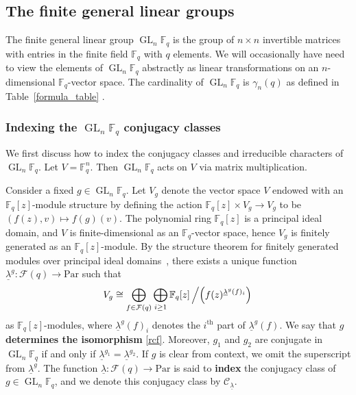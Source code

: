 \documentclass[10pt]{article}
\theoremstyle{definition}
\DeclareMathOperator{\GL}{GL}
\newcommand{\CC}{\mathcal{C}}
\newcommand{\F}{\mathbb{F}}
\newcommand{\CF}{\mathcal{F}}
\newcommand{\isom}{\cong}
\newcommand{\myemph}{\textbf}
\newcommand{\Par}{\text{Par}}
\newcommand{\ulambda}{{\underline{\lambda}}}
\begin{document}
\subsection{The finite general linear groups}

The finite general linear group \(\GL_n \F_q\) is the group of \(n \times n\) invertible matrices with entries in the finite field \(\F_q\) with \(q\) elements.
We will occasionally have need to view the elements of \(\GL_n \F_q\) abstractly as linear transformations on an \(n\)-dimensional \(\F_q\)-vector space.
The cardinality of \(\GL_n \F_q\) is \(\gamma_n(q)\) as defined in Table~\ref{formula_table} \cite[Proposition~1.10.1]{EC1}.

\subsubsection{Indexing the \(\GL_n \F_q\) conjugacy classes} \label{indexing}

We first discuss how to index the conjugacy classes and irreducible characters of $\GL_n \F_q$.
Let $V = \F_q^n$.
Then $\GL_n \F_q$ acts on $V$ via matrix multiplication.

Consider a fixed $g \in \GL_n \F_q$.
Let \(V_g\) denote the vector space $V$ endowed with an $\F_q [z]$-module structure by defining the action $\F_q [z] \times V_g \to V_g$ to be $(f(z), v) \mapsto f(g)(v)$.
The polynomial ring $\F_q[z]$ is a principal ideal domain, and $V$ is finite-dimensional as an $\F_q$-vector space, hence $V_g$ is finitely generated as an $\F_q[z]$-module.
By the structure theorem for finitely generated modules over principal ideal domains~\cite[Theorem~12.1.6]{DF}, there exists a unique function $\ulambda^g : \CF (q) \to \Par$ such that
\begin{equation} \label{rcf}
V_g \isom \bigoplus_{f \in \CF (q)} \bigoplus_{i \geq 1} \F_q [z] \left / \left ( f(z)^{\ulambda^g (f)_i} \right ) \right .
\end{equation}
as $\F_q [z]$-modules,
where $\ulambda^g (f)_i$ denotes the $i^\text{th}$ part of $\ulambda ^g (f)$.
We say that \(g\) \myemph{determines the isomorphism} \eqref{rcf}.
Moreover, \(g_1\) and \(g_2\) are conjugate in \(\GL_n \F_q\) if and only if \(\ulambda^{g_1} = \ulambda^{g_2}\).
If \(g\) is clear from context, we omit the superscript from \(\ulambda^g\).
The function $\ulambda : \CF (q) \to \Par$ is said to \myemph{index} the conjugacy class of $g \in \GL_n \F_q$,
and we denote this conjugacy class by \(\CC_\ulambda\).
\end{document}
